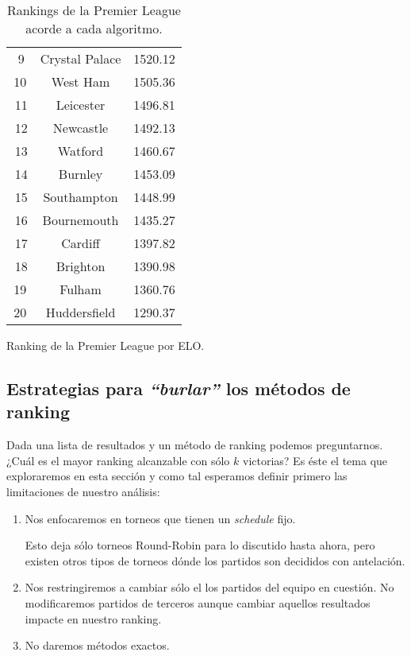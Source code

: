 \documentclass[a4paper]{article}
\newcommand{\bigfatgreen}{\begin{tikzpicture}[x=0.5pt,y=0.6pt,yscale=-.5,xscale=.5]
\draw  [fill=ForestGreen!70,fill opacity=1] (100,123.22) -- (113.25,113) -- (126.5,123.22) -- (119.88,123.22) -- (119.88,138.54) -- (106.63,138.54) -- (106.63,123.22) -- cycle ;
\end{tikzpicture}}
\newcommand{\bigfatred}{\begin{tikzpicture}[x=0.5pt,y=0.6pt,yscale=-.5,xscale=.5, rotate= 180]
\draw  [fill=red!70,fill opacity=1] (100,123.22) -- (113.25,113) -- (126.5,123.22) -- (119.88,123.22) -- (119.88,138.54) -- (106.63,138.54) -- (106.63,123.22) -- cycle ;
\end{tikzpicture}}
\begin{document}
\begin{table}[h]
{\begin{subtable}{0.4\textwidth}
\begin{tabular}{|c|c|c|}
            \bigfatgreen\,9 & Crystal Palace & 1520.12 \\
            10 & West Ham  & 1505.36 \\
            \bigfatred\,11 & Leicester  & 1496.81 \\
            \bigfatgreen\,12 & Newcastle  & 1492.13 \\
            \bigfatred\,13 & Watford & 1460.67 \\
            \bigfatgreen\,14 & Burnley & 1453.09 \\
            \bigfatgreen\,15 & Southampton & 1448.99 \\
            \bigfatred\,16 & Bournemouth & 1435.27  \\
            \bigfatgreen\,17 & Cardiff  & 1397.82 \\
            \bigfatred\,18 & Brighton & 1390.98 \\
            19 & Fulham & 1360.76 \\
            20 & Huddersfield & 1290.37 \\
            \hline
        \end{tabular}
        \caption{Ranking de la Premier League por ELO.}
        \label{subtab:EFL_alg_elo}
    \end{subtable}
    }
    \caption{Rankings de la Premier League acorde a cada algoritmo.}
    \label{tab:EFL}
\end{table}


\subsection{Estrategias para \textit{``burlar''} los métodos de ranking}

Dada una lista de resultados y un método de ranking podemos preguntarnos. ¿Cuál es el mayor ranking alcanzable con sólo $k$ victorias? Es éste el tema que exploraremos en esta sección y como tal esperamos definir primero las limitaciones de nuestro análisis:
\begin{enumerate}
    \item Nos enfocaremos en torneos que tienen un \textit{schedule} fijo.
    
    Esto deja sólo torneos Round-Robin para lo discutido hasta ahora, pero existen otros tipos de torneos dónde los partidos son decididos con antelación.

    \item Nos restringiremos a cambiar sólo el los partidos del equipo en cuestión. No modificaremos partidos de terceros aunque cambiar aquellos resultados impacte en nuestro ranking.

    \item No daremos métodos exactos.
\end{enumerate}
\end{document}
